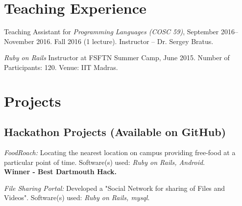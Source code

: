 \documentclass[letterpaper,10pt]{article}
\renewenvironment{itemize}{
  \begin{list}{}{
    \setlength{\leftmargin}{1.5em}
  }
}{
  \end{list}
}
\begin{document}


\section*{Teaching Experience}
\begin{itemize}
\setlength\itemsep{0ex}
\item Teaching Assistant for \textit{Programming Languages (COSC 59)}, September 2016-- November 2016.
		\subitem Fall 2016 (1 lecture). Instructor -- Dr. Sergey Bratus.
\item \textit{Ruby on Rails} Instructor at FSFTN Summer Camp, June 2015.
    \subitem Number of Participants: 120.
    \subitem Venue: IIT Madras.
\end{itemize}



\section*{Projects}
\subsection*{Hackathon Projects (Available on GitHub)}
\begin{itemize}
\setlength\itemsep{0ex}
  \item \textit{FoodRoach:} Locating the nearest location on campus providing free-food at a particular point of time. Software(s) used: \textsl{Ruby on Rails, Android}. \\ {\bf Winner - Best Dartmouth Hack.}
\item \textit{File Sharing Portal:} Developed a "Social Network for sharing of Files and Videos". Software(s) used: \textsl{Ruby on Rails, mysql}.
\end{itemize}
\end{document}
